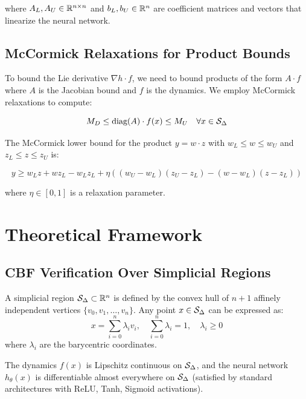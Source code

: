 where $A_L, A_U \in \mathbb{R}^{n \times n}$ and $b_L, b_U \in \mathbb{R}^n$ are coefficient matrices and vectors that linearize the neural network.

\subsection{McCormick Relaxations for Product Bounds}

To bound the Lie derivative $\nabla h \cdot f$, we need to bound products of the form $A \cdot f$ where $A$ is the Jacobian bound and $f$ is the dynamics. We employ McCormick relaxations to compute:

\begin{equation}
    M_D \leq \text{diag}(A) \cdot f(x) \leq M_U \quad \forall x \in \mathcal{S}_\Delta
\end{equation}

The McCormick lower bound for the product $y = w \cdot z$ with $w_L \leq w \leq w_U$ and $z_L \leq z \leq z_U$ is:

\begin{equation}
    y \geq w_L z + w z_L - w_L z_L + \eta((w_U - w_L)(z_U - z_L) - (w - w_L)(z - z_L))
    \label{eq:mccormick}
\end{equation}

where $\eta \in [0,1]$ is a relaxation parameter.

\section{Theoretical Framework}

\subsection{CBF Verification Over Simplicial Regions}

\begin{definition}
    A simplicial region $\mathcal{S}_\Delta \subset \mathbb{R}^n$ is defined by the convex hull of $n+1$ affinely independent vertices $\{v_0, v_1, \ldots, v_n\}$. Any point $x \in \mathcal{S}_\Delta$ can be expressed as:
    \begin{equation}
        x = \sum_{i=0}^n \lambda_i v_i, \quad \sum_{i=0}^n \lambda_i = 1, \quad \lambda_i \geq 0
        \label{eq:barycentric}
    \end{equation}
    where $\lambda_i$ are the barycentric coordinates.
\end{definition}

\begin{assumption}
    The dynamics $f(x)$ is Lipschitz continuous on $\mathcal{S}_\Delta$, and the neural network $h_\theta(x)$ is differentiable almost everywhere on $\mathcal{S}_\Delta$ (satisfied by standard architectures with ReLU, Tanh, Sigmoid activations).
    \label{assum:lipschitz}
\end{assumption}

